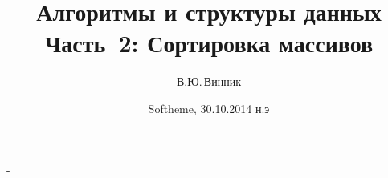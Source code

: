 \documentclass[landscape]{slides}
\begin{document}
\author{В.Ю.\,Винник}

\title{Алгоритмы и структуры данных\\
Часть~2: Сортировка массивов}

\date{Softheme, 30.10.2014 н.э}

\maketitle

\begin{slide}
-
\end{slide}
\end{document}
